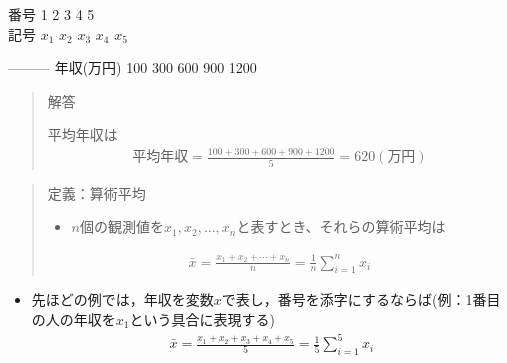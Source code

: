 \documentclass[
]{book}
\providecommand{\tightlist}{%
  \setlength{\itemsep}{0pt}\setlength{\parskip}{0pt}}
\theoremstyle{definition}
\theoremstyle{definition}
\theoremstyle{definition}
\theoremstyle{definition}
\theoremstyle{remark}
\begin{document}
番号 \textbar{} 1 \textbar{} 2 \textbar{} 3 \textbar{} 4 \textbar{} 5 \textbar{}\\
記号 \textbar{} \(x_1\) \textbar{} \(x_2\) \textbar{} \(x_3\) \textbar{} \(x_4\) \textbar{} \(x_5\) \textbar{}

\textbar--\textbar--\textbar--\textbar--\textbar--\textbar--\textbar{}
\textbar{} 年収(万円) \textbar{} 100 \textbar{} 300 \textbar{} 600 \textbar{} 900 \textbar{} 1200 \textbar{}

\begin{quote}
解答

平均年収は
\begin{align*}
\text{平均年収}=\frac{100+300+600+900+1200}{5}=620(\text{万円})
\end{align*}
\end{quote}

\begin{quote}
定義：算術平均

\begin{itemize}
\tightlist
\item
  \(n\)個の観測値を\(x_1,x_2,\dots,x_n\)と表すとき、それらの算術平均は
\end{itemize}

\begin{eqnarray*}
\bar{x}=\frac{x_1+x_2+\cdots+x_n}{n}=\frac{1}{n}\sum_{i=1}^n x_i
\end{eqnarray*}
\end{quote}

\begin{itemize}
\tightlist
\item
  先ほどの例では，年収を変数\(x\)で表し，番号を添字にするならば(例：1番目の人の年収を\(x_1\)という具合に表現する)
  \begin{align*}
  \bar{x}=\frac{x_1+x_2+x_3+x_4+x_5}{5}=\frac{1}{5}\sum_{i=1}^5 x_i
  \end{align*}
\end{itemize}
\end{document}

